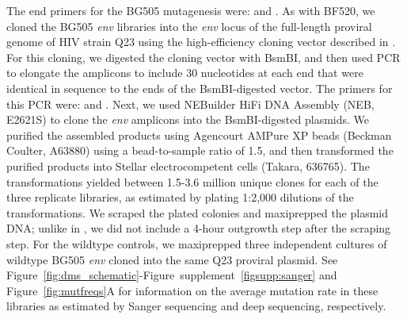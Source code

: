 \documentclass[9pt]{elife}
\begin{document}
The end primers for the BG505 mutagenesis were:  and .
As with BF520, we cloned the BG505 \textit{env} libraries into the \textit{env} locus of the full-length proviral genome of HIV strain Q23 \citep[another subtype-A transmitted/founder virus;][]{poss1999variants} using the high-efficiency cloning vector described in \citet{dingens2017comprehensive}.
For this cloning, we digested the cloning vector with BsmBI, and then used PCR to elongate the amplicons to include 30 nucleotides at each end that were identical in sequence to the ends of the BsmBI-digested vector.
The primers for this PCR were:
 and .
Next, we used NEBuilder HiFi DNA Assembly (NEB, E2621S) to clone the \textit{env} amplicons into the BsmBI-digested plasmids.
We purified the assembled products using Agencourt AMPure XP beads (Beckman Coulter, A63880) using a bead-to-sample ratio of 1.5, and then transformed the purified products into Stellar electrocompetent cells (Takara, 636765).
The transformations yielded between 1.5-3.6 million unique clones for each of the three replicate libraries, as estimated by plating 1:2,000 dilutions of the transformations.
We scraped the plated colonies and maxiprepped the plasmid DNA; unlike in \citet{dingens2017comprehensive}, we did not include a 4-hour outgrowth step after the scraping step.
For the wildtype controls, we maxiprepped three independent cultures of wildtype BG505 \textit{env} cloned into the same Q23 proviral plasmid.
See Figure~\ref{fig:dms_schematic}-Figure~supplement~\ref{figsupp:sanger} and Figure~\ref{fig:mutfreqs}A for information on the average mutation rate in these libraries as estimated by Sanger sequencing and deep sequencing, respectively.
\end{document}
